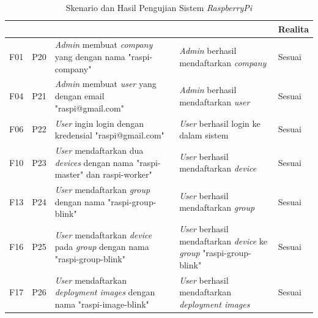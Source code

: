 \bgroup
\begin{table}[ht]
  \def\arraystretch{1.3}
  \caption{Skenario dan Hasil Pengujian Sistem \textit{RaspberryPi}}
  \label{tab:pengujian-sistem-raspi}
  \centering
  \begin{tabular}{|p{2cm}|p{2cm}|p{4cm}|p{3cm}|p{2cm}|}
    \hline
    \centering{ID Fungsional} & \centering{ID Pengujian}                            & \centering{Skenario}                                                                           & \centering{Ekspektasi}                                                                    & Realita \\
    \hline
    F01                       & P20                                                 & \textit{Admin} membuat \textit{company} yang dengan nama "raspi-company"                       & \textit{Admin} berhasil mendaftarkan \textit{company}                                     & Sesuai  \\
    \hline
    F04                       & P21                                                 & \textit{Admin} membuat \textit{user} yang dengan email "raspi@gmail.com"                       & \textit{Admin} berhasil mendaftarkan \textit{user}                                        & Sesuai  \\
    \hline
    F06                       & P22                                                 & \textit{User} ingin login dengan kredensial "raspi@gmail.com"                                  & \textit{User} berhasil login ke dalam sistem                                              & Sesuai  \\
    \hline
    F10                       & P23                                                 & \textit{User} mendaftarkan dua \textit{devices} dengan nama "raspi-master" dan
    raspi-worker"             & \textit{User} berhasil mendaftarkan \textit{device} & Sesuai                                                                                                                                                                                               \\
    \hline
    F13                       & P24                                                 & \textit{User} mendaftarkan \textit{group} dengan nama "raspi-group-blink"                      & \textit{User} berhasil mendaftarkan \textit{group}                                        & Sesuai  \\
    \hline
    F16                       & P25                                                 & \textit{User} mendaftarkan \textit{device} pada \textit{group} dengan nama "raspi-group-blink" & \textit{User} berhasil mendaftarkan \textit{device} ke \textit{group} "raspi-group-blink" & Sesuai  \\
    \hline
    F17                       & P26                                                 & \textit{User} mendaftarkan \textit{deployment images} dengan nama "raspi-image-blink"          & \textit{User} berhasil mendaftarkan \textit{deployment images}                            & Sesuai  \\
    \hline
  \end{tabular}
\end{table}
\egroup

